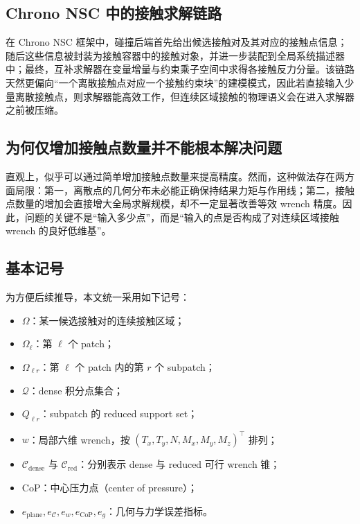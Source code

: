 \label{sec:preliminaries}

\subsection{Chrono NSC 中的接触求解链路}

在 Chrono NSC 框架中，碰撞后端首先给出候选接触对及其对应的接触点信息；随后这些信息被封装为接触容器中的接触对象，并进一步装配到全局系统描述器中；最终，互补求解器在变量增量与约束乘子空间中求得各接触反力分量。该链路天然更偏向“一个离散接触点对应一个接触约束块”的建模模式，因此若直接输入少量离散接触点，则求解器能高效工作，但连续区域接触的物理语义会在进入求解器之前被压缩。

\subsection{为何仅增加接触点数量并不能根本解决问题}

直观上，似乎可以通过简单增加接触点数量来提高精度。然而，这种做法存在两方面局限：第一，离散点的几何分布未必能正确保持结果力矩与作用线；第二，接触点数量的增加会直接增大全局求解规模，却不一定显著改善等效 wrench 精度。因此，问题的关键不是“输入多少点”，而是“输入的点是否构成了对连续区域接触 wrench 的良好低维基”。

\subsection{基本记号}

为方便后续推导，本文统一采用如下记号：
\begin{itemize}[leftmargin=2em]
    \item $\Omega$：某一候选接触对的连续接触区域；
    \item $\Omega_\ell$：第 $\ell$ 个 patch；
    \item $\Omega_{\ell r}$：第 $\ell$ 个 patch 内的第 $r$ 个 subpatch；
    \item $\mathcal{Q}$：dense 积分点集合；
    \item $Q_{\ell r}$：subpatch 的 reduced support set；
    \item $w$：局部六维 wrench，按 $(T_x,T_y,N,M_x,M_y,M_z)^\top$ 排列；
    \item $\mathcal{C}_{\mathrm{dense}}$ 与 $\mathcal{C}_{\mathrm{red}}$：分别表示 dense 与 reduced 可行 wrench 锥；
    \item CoP：中心压力点（center of pressure）；
    \item $e_{\mathrm{plane}}, e_{\mathcal{C}}, e_w, e_{\mathrm{CoP}}, e_g$：几何与力学误差指标。
\end{itemize}
